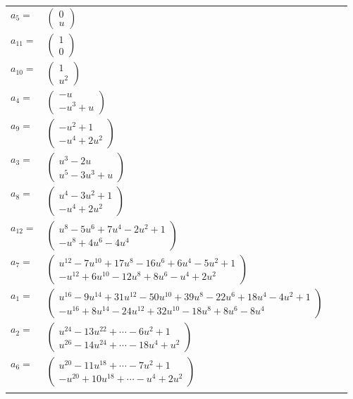 \documentclass[1p]{elsarticle_modified}
\theoremstyle{definition}
\begin{document}
\begin{tabular}{m{7pt} m{180pt} m{7pt} m{180pt} }
\flushright $a_{5}=$&$\begin{pmatrix}0\\u\end{pmatrix}$ \\
\flushright $a_{11}=$&$\begin{pmatrix}1\\0\end{pmatrix}$ \\
\flushright $a_{10}=$&$\begin{pmatrix}1\\u^2\end{pmatrix}$ \\
\flushright $a_{4}=$&$\begin{pmatrix}- u\\- u^3+u\end{pmatrix}$ \\
\flushright $a_{9}=$&$\begin{pmatrix}- u^2+1\\- u^4+2 u^2\end{pmatrix}$ \\
\flushright $a_{3}=$&$\begin{pmatrix}u^3-2 u\\u^5-3 u^3+u\end{pmatrix}$ \\
\flushright $a_{8}=$&$\begin{pmatrix}u^4-3 u^2+1\\- u^4+2 u^2\end{pmatrix}$ \\
\flushright $a_{12}=$&$\begin{pmatrix}u^8-5 u^6+7 u^4-2 u^2+1\\- u^8+4 u^6-4 u^4\end{pmatrix}$ \\
\flushright $a_{7}=$&$\begin{pmatrix}u^{12}-7 u^{10}+17 u^8-16 u^6+6 u^4-5 u^2+1\\- u^{12}+6 u^{10}-12 u^8+8 u^6- u^4+2 u^2\end{pmatrix}$ \\
\flushright $a_{1}=$&$\begin{pmatrix}u^{16}-9 u^{14}+31 u^{12}-50 u^{10}+39 u^8-22 u^6+18 u^4-4 u^2+1\\- u^{16}+8 u^{14}-24 u^{12}+32 u^{10}-18 u^8+8 u^6-8 u^4\end{pmatrix}$ \\
\flushright $a_{2}=$&$\begin{pmatrix}u^{24}-13 u^{22}+\cdots-6 u^2+1\\u^{26}-14 u^{24}+\cdots-18 u^4+u^2\end{pmatrix}$ \\
\flushright $a_{6}=$&$\begin{pmatrix}u^{20}-11 u^{18}+\cdots-7 u^2+1\\- u^{20}+10 u^{18}+\cdots- u^4+2 u^2\end{pmatrix}$\\&\end{tabular}
\end{document}
